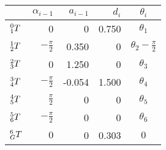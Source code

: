 \centering
\begin{tabular}{l|rrrc}
        & $\alpha_{i-1}$ & $a_{i-1}$ & $d_i$ & $\theta_i$ \\
\hline
$\T{0}{1}$ &                0 &    0   & 0.750 & $\theta_1$ \\
$\T{1}{2}$ & $-\frac{\pi}{2}$ &  0.350 &     0 & $\theta_2 - \frac{\pi}{2}$ \\
$\T{2}{3}$ &                0 &  1.250 &     0 & $\theta_3$ \\
$\T{3}{4}$ & $-\frac{\pi}{2}$ & -0.054 & 1.500 & $\theta_4$ \\
$\T{4}{5}$ & $ \frac{\pi}{2}$ &      0 &     0 & $\theta_5$ \\
$\T{5}{6}$ & $-\frac{\pi}{2}$ &      0 &     0 & $\theta_6$ \\
$\T{6}{G}$ &  $           0 $ &      0 & 0.303 & $0$ \\
\end{tabular}

